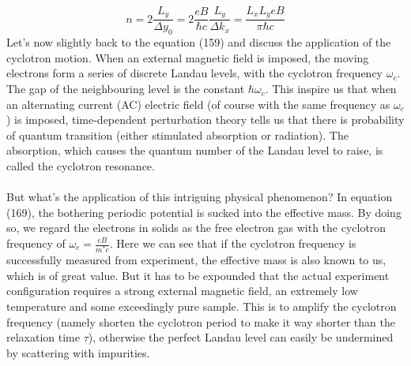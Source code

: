 \documentclass{article}
\begin{document}
\begin{equation}
    n=2\frac{L_y}{\Delta{y}_0}=2\frac{eB}{\hbar{c}}\frac{L_y}{\Delta{k_x}}=\frac{L_xL_yeB}{\pi\hbar{c}}
\end{equation}Let's now slightly back to the equation (159) and discuss the application of the cyclotron motion. When an external magnetic field is imposed, the moving electrons form a series of discrete Landau levels, with the cyclotron frequency $\omega_c$. The gap of the neighbouring level is the constant $\hbar\omega_c$. This inspire us that when an alternating current (AC) electric field (of course with the same frequency as $\omega_c$) is imposed, time-dependent perturbation theory tells us that there is probability of quantum transition (either 
stimulated absorption or radiation). The absorption, which causes the quantum number of the Landau level to raise, is called the cyclotron resonance.\\
\\
But what's the application of this intriguing physical phenomenon? In equation (169), the bothering periodic potential is sucked into the effective mass. By doing so, we regard the electrons in solids as the free electron gas with the cyclotron frequency of $\omega_c=\frac{eB}{m^*c}$. Here we can see that if the cyclotron frequency is successfully measured from experiment, the effective mass is also known to us, which is of great value. But it has to be expounded that the actual experiment configuration requires a strong external magnetic field, an extremely low temperature and some exceedingly pure sample. This is to amplify the cyclotron frequency (namely shorten the cyclotron period to make it way shorter than the relaxation time $\tau$), otherwise the perfect Landau level can easily be undermined by scattering with impurities.\\
\\
\end{document}
